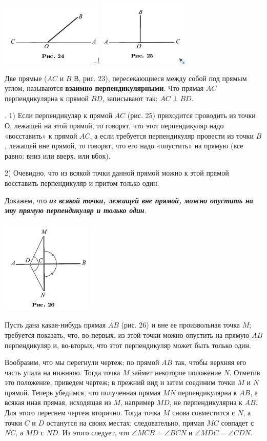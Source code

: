 \documentclass[oneside]{book}
\begin{document}
\includegraphics{pics/ris-24}
\includegraphics{pics/ris-25}

Две прямые ($AC$ и $B$ В, рис. 23), пересекающиеся между собой под прямым углом, называются \textbf{взаимно перпендикулярными}.
Что прямая $AC$ перпендикулярна к прямой $BD$, записывают так: $AC\perp BD$.

.
1) Если перпендикуляр к прямой $AC$ (рис. 25) приходится проводить из точки О, лежащей на этой прямой, то говорят, что этот перпендикуляр надо «восставить» к прямой $AC$, а если требуется перпендикуляр провести из точки $B$, лежащей вне прямой, то говорят, что его надо «опустить» на прямую (все равно:
вниз или вверх, или вбок).

2) Очевидно, что из всякой точки данной прямой можно к этой прямой восставить перпендикуляр и притом только один.

Докажем, что \textbf{\emph{из всякой точки, лежащей вне прямой, можно опустить на эту прямую перпендикуляр и только один}}.

\includegraphics{pics/ris-26}

Пусть дана какая-нибудь прямая $AB$ (рис. 26) и вне ее произвольная точка $M$;
требуется показать, что, во-первых, из этой точки можно опустить на прямую $AB$ перпендикуляр и, во-вторых, что этот перпендикуляр может быть только один.

Вообразим, что мы перегнули чертеж;
по прямой $AB$ так, чтобы верхняя его часть упала на нижнюю.
Тогда точка $M$ займет некоторое положение $N$.
Отметив это положение, приведем чертеж;
в прежний вид и затем соединим точки $M$ и $N$ прямой.
Теперь убедимся, что полученная прямая $MN$ перпендикулярна к $AB$, а всякая иная прямая, исходящая из $M$, например $MD$, не перпендикулярна к $AB$.
Для этого перегнем чертеж вторично.
Тогда точка $M$ снова совместится с $N$, а точки $C$ и $D$ останутся на своих местах;
следовательно, прямая $MC$ совпадет с $NC$, а $MD$ с $ND$.
Из этого следует, что $\angle MCB = \angle BCN$ и $\angle MDC = \angle CDN$.
\end{document}
